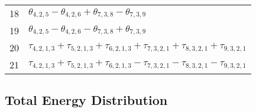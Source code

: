 \documentclass[10pt,oneside]{article}
\begin{document}
\begin{table}[h!]
\begin{tabular}{ll}
  18  & $\theta_{4,2,5} - \theta_{4,2,6} + \theta_{7,3,8} - \theta_{7,3,9}$ \\
  19  & $\theta_{4,2,5} - \theta_{4,2,6} - \theta_{7,3,8} + \theta_{7,3,9}$ \\
  20  & $\tau_{4,2,1,3} + \tau_{5,2,1,3} + \tau_{6,2,1,3} + \tau_{7,3,2,1} + \tau_{8,3,2,1} + \tau_{9,3,2,1}$ \\
  21  & $\tau_{4,2,1,3} + \tau_{5,2,1,3} + \tau_{6,2,1,3} - \tau_{7,3,2,1} - \tau_{8,3,2,1} - \tau_{9,3,2,1}$ \\
\bottomrule
\end{tabular}
\end{table}

\begin{table}
\subsection*{Total Energy Distribution}
\centering\end{table}

\clearpage

\subsection{}
\end{document}
